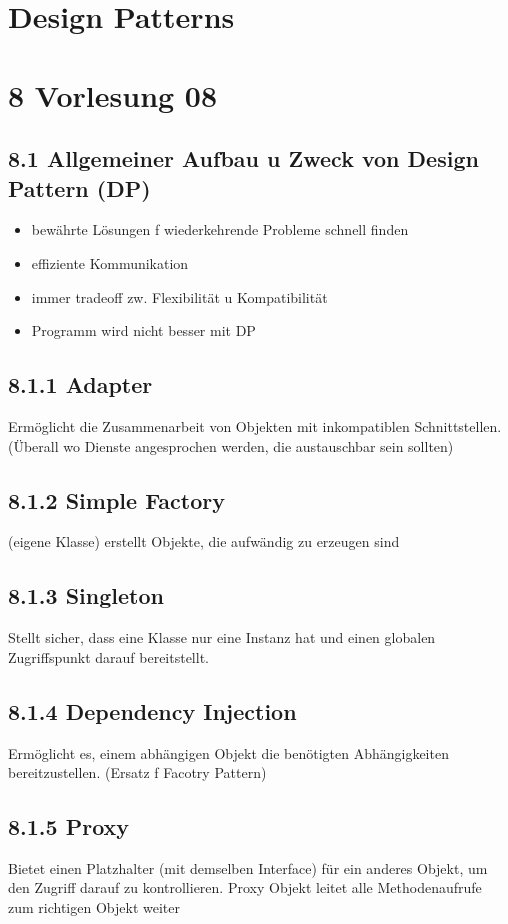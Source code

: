 \section{Design Patterns}

\section*{8 Vorlesung 08}
\subsection*{8.1 Allgemeiner Aufbau u Zweck von Design Pattern (DP)}
\begin{itemize}
  \item bewährte Lösungen f wiederkehrende Probleme schnell finden
  \item effiziente Kommunikation
  \item immer tradeoff zw. Flexibilität u Kompatibilität
  \item Programm wird nicht besser mit DP
\end{itemize}

\subsection*{8.1.1 Adapter}
Ermöglicht die Zusammenarbeit von Objekten mit inkompatiblen Schnittstellen. (Überall wo Dienste angesprochen werden, die austauschbar sein sollten)

\subsection*{8.1.2 Simple Factory}
(eigene Klasse) erstellt Objekte, die aufwändig zu erzeugen sind

\subsection*{8.1.3 Singleton}
Stellt sicher, dass eine Klasse nur eine Instanz hat und einen globalen Zugriffspunkt darauf bereitstellt.

\subsection*{8.1.4 Dependency Injection}
Ermöglicht es, einem abhängigen Objekt die benötigten Abhängigkeiten bereitzustellen. (Ersatz f Facotry Pattern)

\subsection*{8.1.5 Proxy}
Bietet einen Platzhalter (mit demselben Interface) für ein anderes Objekt, um den Zugriff darauf zu kontrollieren. Proxy Objekt leitet alle Methodenaufrufe zum richtigen Objekt weiter

